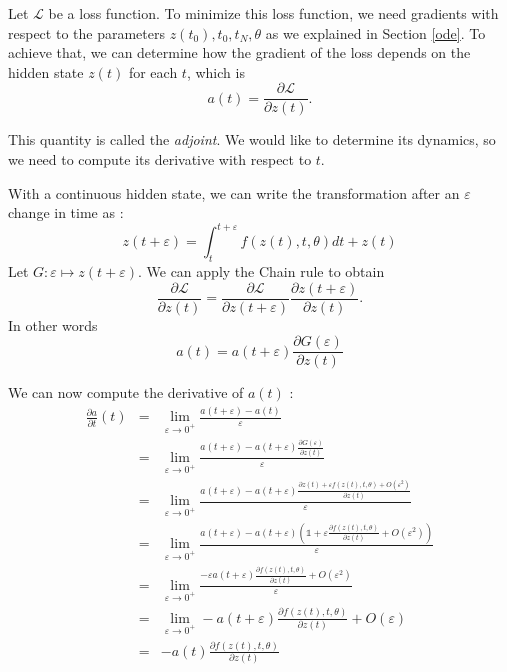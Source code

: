 \documentclass[10pt,a4paper]{article}
\theoremstyle{definition}
\theoremstyle{plain}
\begin{document}
Let $\mathcal{L}$ be a loss function. To minimize this loss function, we need gradients with respect to the parameters $z(t_0),t_0,t_N,\theta$ as we explained in Section \ref{ode}. To achieve that, we can determine how the gradient of the loss depends on the hidden state $z(t)$ for each $t$, which is
\begin{equation}
a(t)= \frac{\partial \mathcal{L}}{\partial z(t)}.
\end{equation}

This quantity is called the \textit{adjoint}. We would like to determine its dynamics, so we need to compute its derivative with respect to $t$.

With a continuous hidden state, we can write the transformation after an $\varepsilon$ change in time as :
\begin{equation}
\label{zteps}
z(t+\varepsilon) = \int^{t+\varepsilon}_{t} f(z(t),t,\theta) dt + z(t)
\end{equation}
Let $ G : \varepsilon \mapsto z(t+\varepsilon)$. We can apply the Chain rule to obtain
\begin{equation*}
\frac{\partial \mathcal{L}}{\partial z(t)} = \frac{\partial \mathcal{L}}{\partial z(t+\varepsilon)} \frac{\partial z(t+\varepsilon)}{\partial z(t)}.
\end{equation*}
In other words 
\begin{equation}
\label{at}
a(t) = a(t+\varepsilon)\frac{\partial G(\varepsilon)}{\partial z(t)}
\end{equation}


We can now compute the derivative of $a(t)$ :
\begin{eqnarray*}
\frac{\partial a}{\partial t}(t) &=& \lim_{\varepsilon \rightarrow 0^+} \frac{a(t+\varepsilon) - a(t)}{\varepsilon}\\
&=& \lim_{\varepsilon \rightarrow 0^+} \frac{a(t+\varepsilon) - a(t+\varepsilon)\frac{\partial G(\varepsilon)}{\partial z(t)}}{\varepsilon}\\
&=& \lim_{\varepsilon \rightarrow 0^+} \frac{a(t+\varepsilon) - a(t+\varepsilon)\frac{\partial z(t) + \varepsilon f(z(t),t,\theta) + O(\varepsilon^2)}{\partial z(t)}}{\varepsilon} \\
&=& \lim_{\varepsilon \rightarrow 0^+} \frac{a(t+\varepsilon) - a(t+\varepsilon)(\mathds{1} + \varepsilon \frac{\partial f(z(t),t,\theta)} {\partial z(t)}+ O(\varepsilon^2))}{\varepsilon}\\
&=& \lim_{\varepsilon \rightarrow 0^+} \frac{-\varepsilon a(t+\varepsilon) \frac{\partial f(z(t),t,\theta)} {\partial z(t)}+ O(\varepsilon^2)}{\varepsilon}\\
&=& \lim_{\varepsilon \rightarrow 0^+} - a(t+\varepsilon) \frac{\partial f(z(t),t,\theta)} {\partial z(t)}+ O(\varepsilon)\\
&=& -a(t)\frac{\partial f(z(t),t,\theta)} {\partial z(t)}
\end{eqnarray*}
\end{document}
